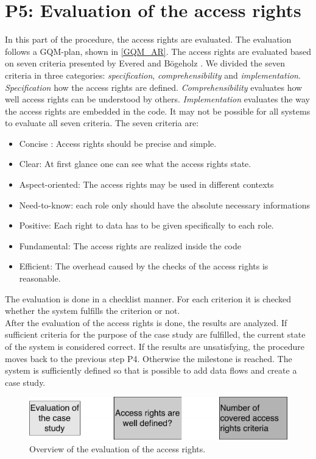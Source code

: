 \section{P5: Evaluation of the access rights}
In this part of the procedure, the access rights are evaluated. The evaluation follows a GQM-plan, shown in \autoref{GQM_AR}.
The access rights are evaluated based on seven criteria presented by Evered and Bögeholz \cite{CaseStudyAndAccessrigths}. We divided the seven criteria in three categories: \textit{specification}, \textit{comprehensibility} and \textit{implementation}. \textit{Specification} how the access rights are defined. \textit{Comprehensibility} evaluates how well access rights can be understood by others. \textit{Implementation} evaluates the way the access rights are embedded in the code. It may not be possible for all systems to evaluate all seven criteria. The seven criteria are:
\begin{itemize}
\item Concise : Access rights should be precise and simple.
\item Clear: At first glance one can see what the access rights state.
\item Aspect-oriented: The access rights may be used in different contexts
\item Need-to-know: each role only should have the absolute necessary informations
\item Positive: Each right to data has to be given specifically to each role.
\item Fundamental: The access rights are realized inside the code 
\item Efficient: The overhead caused by the checks of the access rights is reasonable.
\end{itemize}
The evaluation is done in a checklist manner. For each criterion it is checked whether the system fulfills the criterion or not.\\
After the evaluation of the access rights is done, the results are analyzed. If sufficient criteria for the purpose of the case study are fulfilled, the current state of the system is considered correct. If the results are unsatisfying, the procedure moves back to the previous step P4. Otherwise the milestone is reached. The system is sufficiently defined so that is possible to add data flows and create a case study.
\begin{figure}
\includegraphics[scale=.6]{logos/GQM_accessrights.pdf}
\caption{Overview of the evaluation of the access rights.}
\label{GQM_AR}
\end{figure}
